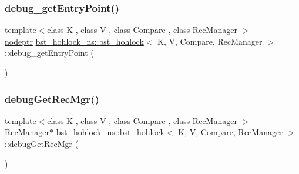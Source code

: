 \mbox{\label{classbst__hohlock__ns_1_1bst__hohlock_a796fb5841aeebb3fb1927b0de4a86e5c}} 
\subsubsection{\texorpdfstring{debug\+\_\+get\+Entry\+Point()}{debug\_getEntryPoint()}}
{\footnotesize\ttfamily template$<$class K , class V , class Compare , class Rec\+Manager $>$ \\
\hyperlink{bst__rwlock__impl_8h_a04158d2a20768fe447133ff555823b05}{nodeptr} \hyperlink{classbst__hohlock__ns_1_1bst__hohlock}{bst\+\_\+hohlock\+\_\+ns\+::bst\+\_\+hohlock}$<$ K, V, Compare, Rec\+Manager $>$\+::debug\+\_\+get\+Entry\+Point (\begin{DoxyParamCaption}{ }\end{DoxyParamCaption})\hspace{0.3cm}{\ttfamily [inline]}}

\mbox{\label{classbst__hohlock__ns_1_1bst__hohlock_af92c09e1d46b07ba45e6efd202637bad}} 
\subsubsection{\texorpdfstring{debug\+Get\+Rec\+Mgr()}{debugGetRecMgr()}}
{\footnotesize\ttfamily template$<$class K , class V , class Compare , class Rec\+Manager $>$ \\
Rec\+Manager$\ast$ \hyperlink{classbst__hohlock__ns_1_1bst__hohlock}{bst\+\_\+hohlock\+\_\+ns\+::bst\+\_\+hohlock}$<$ K, V, Compare, Rec\+Manager $>$\+::debug\+Get\+Rec\+Mgr (\begin{DoxyParamCaption}{ }\end{DoxyParamCaption})\hspace{0.3cm}{\ttfamily [inline]}}

